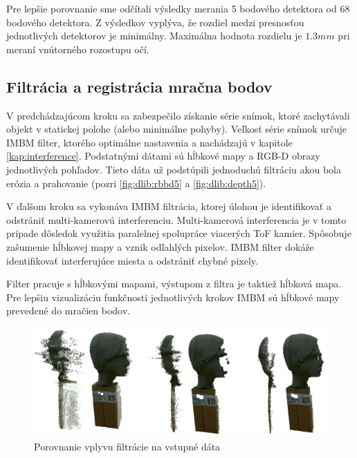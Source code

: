 Pre lepšie porovnanie sme odčítali výsledky merania 5 bodového detektora od 68 bodového detektora. Z výsledkov vyplýva, že rozdiel medzi presnosťou jednotlivých detektorov je minimálny. Maximálna hodnota rozdielu je $1.3mm$ pri meraní vnútorného rozostupu očí.  

\subsection{Filtrácia a registrácia mračna bodov}

V predchádzajúcom kroku sa zabezpečilo získanie série snímok, ktoré zachytávali objekt v statickej polohe (alebo minimálne pohyby). Veľkosť série snímok určuje IMBM filter, ktorého optimálne nastavenia a nachádzajú v kapitole \ref{kap:interference}. Podstatnými dátami sú hĺbkové mapy a RGB-D obrazy jednotlivých pohľadov. Tieto dáta už podstúpili jednoduchú filtráciu akou bola erózia a prahovanie (pozri \ref{fig:dlib:rbbd5} a \ref{fig:dlib:depth5}). 

V ďalšom kroku sa vykonáva IMBM filtrácia, ktorej úlohou je identifikovať a odstrániť multi-kamerovú interferenciu. Multi-kamerová interferencia je v tomto prípade dôsledok využitia paralelnej spolupráce viacerých ToF kamier. Spôsobuje zašumenie hĺbkovej mapy a vznik odľahlých pixelov. IMBM filter dokáže identifikovať interferujúce miesta a odstrániť chybné pixely. 

Filter pracuje s hĺbkovými mapami, výstupom z filtra je taktiež hĺbková mapa. Pre lepšiu vizualizáciu funkčnosti jednotlivých krokov IMBM sú hĺbkové mapy prevedené do mračien bodov.  

\begin{figure}[H]
	\centering
	\includegraphics[width=\textwidth]{figures/prepared_models.png}
	\caption{Porovnanie vplyvu filtrácie na vstupné dáta}
	\label{fig:imbm:result:a}
	\label{fig:imbm:result:b}
	\label{fig:imbm:result:c}
\end{figure}

